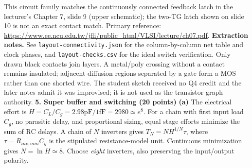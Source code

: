 \documentclass[10pt]{article}
\begin{document}
This circuit family matches the continuously connected feedback latch in the lecturer's Chapter 7, slide 9 (upper schematic); the two-TG latch shown on slide 10 is not an exact contact match. Primary reference: \url{https://www.ee.ncu.edu.tw/jfli/public_html/VLSI/lecture/ch07.pdf}.
\textbf{Extraction notes.} See \texttt{layout-connectivity.json} for the column-by-column net table and clock phases, and \texttt{layout-checks.csv} for the ideal switch verification. Only drawn black contacts join layers. A metal/poly crossing without a contact remains insulated; adjacent diffusion regions separated by a gate form a MOS rather than one shorted wire. The student sketch received no Q4 credit and the later notes admit it was improvised; it is not used as the transistor graph authority.
\newpage
\textbf{5. Super buffer and switching (20 points)}
\textbf{(a)} The electrical effort is $H=C_L/C_g=2.98\mathrm{pF}/1\mathrm{fF}=2980\simeq e^8$. For a chain with first input load $C_g$, no parasitic delay, and proportional sizing, equal stage efforts minimize the sum of RC delays. A chain of $N$ inverters gives $T_N=N H^{1/N}\tau$, where $\tau=R_{inv,min}C_g$ is the stipulated resistance-model unit. Continuous minimization gives $N=\ln H\simeq8$. Choose \emph{eight} inverters, also preserving the input/output polarity.
\end{document}
